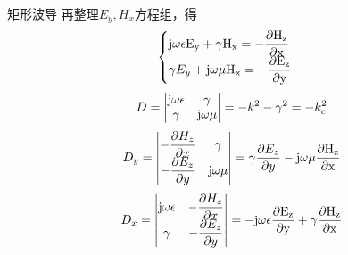 \begin{frame}{矩形波导}
    再整理$E_y,H_x$方程组，得
    \begin{align*}
        \begin{cases}
            \rm{j}\omega\epsilon E_y+\gamma H_x=-\dfrac{\partial H_z}{\partial x}\\
            \gamma E_y+\rm{j}\omega\mu H_x=-\dfrac{\partial E_z}{\partial y}
        \end{cases}
    \end{align*}
    \begin{align*}
        D=
        \begin{vmatrix}
            \rm{j}\omega\epsilon & \gamma \\
            \gamma & \rm{j}\omega\mu\\
        \end{vmatrix}
        =-k^2-\gamma^2=-k_c^2
    \end{align*}
    \begin{align*}
        D_y=
        \begin{vmatrix}
            -\dfrac{\partial H_z}{\partial x} & \gamma \\
            -\dfrac{\partial E_z}{\partial y} & \rm{j}\omega\mu\\
        \end{vmatrix}
        =\gamma\frac{\partial E_z}{\partial y}-\rm{j}\omega\mu\frac{\partial H_z}{\partial x}
    \end{align*}
    \begin{align*}
        D_x=
        \begin{vmatrix}
            \rm{j}\omega\epsilon & -\dfrac{\partial H_z}{\partial x} \\
            \gamma & -\dfrac{\partial E_z}{\partial y}\\
        \end{vmatrix}
        =-\rm{j}\omega\epsilon\frac{\partial E_z}{\partial y}+\gamma \frac{\partial H_z}{\partial x}
    \end{align*}
\end{frame}

